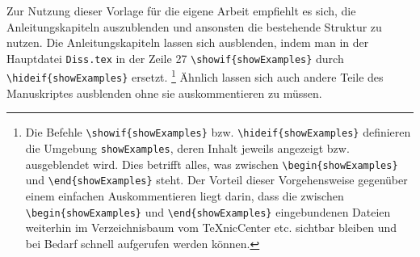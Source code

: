 \begin{showExamples}
Zur Nutzung dieser Vorlage für die eigene Arbeit empfiehlt es sich, die Anleitungskapiteln auszublenden und ansonsten die bestehende Struktur zu nutzen.
Die Anleitungskapiteln lassen sich ausblenden, indem man in der Hauptdatei \texttt{Diss.tex} in der Zeile 27 \verb+\showif{showExamples}+ durch \verb+\hideif{showExamples}+ ersetzt.%
%
\footnote{Die Befehle \verb+\showif{showExamples}+ bzw. \verb+\hideif{showExamples}+ definieren die Umgebung \texttt{showExamples}, deren Inhalt jeweils angezeigt bzw. ausgeblendet wird.
Dies betrifft alles, was zwischen \verb+\begin{showExamples}+ und \verb+\end{showExamples}+ steht.
Der Vorteil dieser Vorgehensweise gegenüber einem einfachen Auskommentieren liegt darin,
dass die zwischen \verb+\begin{showExamples}+ und \verb+\end{showExamples}+ eingebundenen Dateien
weiterhin im Verzeichnisbaum vom TeXnicCenter etc. sichtbar bleiben und bei Bedarf schnell aufgerufen werden können.}
%
Ähnlich lassen sich auch andere Teile des Manuskriptes ausblenden ohne sie auskommentieren zu müssen.
%



%
%
%
%
%
%
%
%
%
%
%
%
%
%
%
%
%
%
%
%
\end{showExamples}%